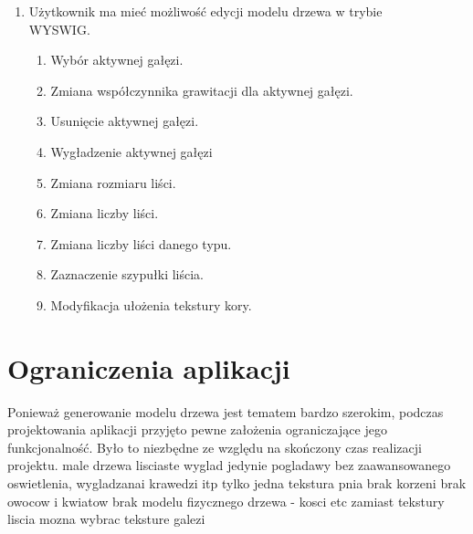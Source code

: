 \begin{enumerate}
\item Użytkownik ma mieć możliwość edycji modelu drzewa w trybie \\WYSWIG.
\begin{enumerate}
\item Wybór aktywnej gałęzi.
\item Zmiana współczynnika grawitacji dla aktywnej gałęzi.
\item Usunięcie aktywnej gałęzi.
\item Wygładzenie aktywnej gałęzi
\item Zmiana rozmiaru liści.
\item Zmiana liczby liści.
\item Zmiana liczby liści danego typu.
\item Zaznaczenie szypułki liścia.
\item Modyfikacja ułożenia tekstury kory.
\end{enumerate}
\end{enumerate}

\section{Ograniczenia aplikacji}
Ponieważ generowanie modelu drzewa jest tematem bardzo szerokim, podczas projektowania
aplikacji przyjęto pewne założenia ograniczające jego funkcjonalność. Było to niezbędne ze
względu na skończony czas realizacji projektu.
male drzewa lisciaste
wyglad jedynie pogladawy bez zaawansowanego oswietlenia, wygladzanai krawedzi itp
tylko jedna tekstura pnia
brak korzeni
brak owocow i kwiatow
brak modelu fizycznego drzewa - kosci etc
zamiast tekstury liscia mozna wybrac teksture galezi
